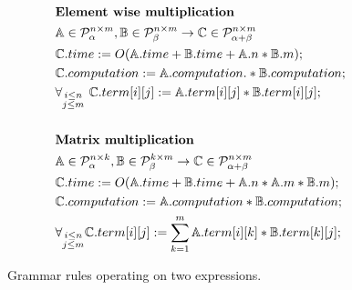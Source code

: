 \begin{figure}
\begin{framed}
\begin{align*}
&\text{{\bf Element wise multiplication}}\\
&\mathbb{A} \in \mathcal{P}^{n \times m}_\alpha, \mathbb{B} \in \mathcal{P}^{n \times m}_\beta \rightarrow \mathbb{C} \in \mathcal{P}^{n \times m}_{\alpha + \beta} \\
&\mathbb{C}.time := O(\mathbb{A}.time + \mathbb{B}.time + \mathbb{A}.n * \mathbb{B}.m);\\
&\mathbb{C}.computation := \mathbb{A}.computation .* \mathbb{B}.computation;\\
&\forall_{\substack{i \leq n\\j \leq m}}\text{ }\mathbb{C}.term[i][j] := \mathbb{A}.term[i][j] * \mathbb{B}.term[i][j];\\
& \\
&\text{{\bf Matrix multiplication}}\\
&\mathbb{A} \in \mathcal{P}^{n \times k}_\alpha, \mathbb{B} \in \mathcal{P}^{k \times m}_\beta \rightarrow \mathbb{C} \in \mathcal{P}^{n \times m}_{\alpha + \beta} \\
&\mathbb{C}.time := O(\mathbb{A}.time + \mathbb{B}.time + \mathbb{A}.n * \mathbb{A}.m * \mathbb{B}.m);\\
&\mathbb{C}.computation := \mathbb{A}.computation * \mathbb{B}.computation;\\
&\forall_{\substack{i \leq n\\j \leq m}}\mathbb{C}.term[i][j] := \sum_{k = 1}^m \mathbb{A}.term[i][k] * \mathbb{B}.term[k][j];
\end{align*}
\caption{Grammar rules operating on two expressions.}
\label{fig:rules2}
\end{framed}
\end{figure}


